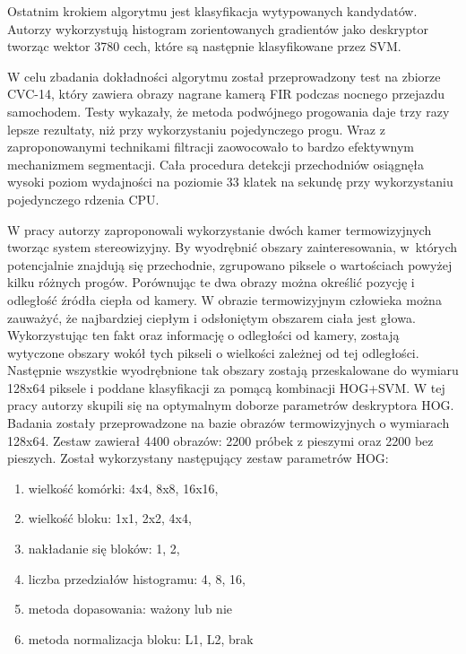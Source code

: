 Ostatnim krokiem algorytmu jest klasyfikacja wytypowanych kandydatów. 
Autorzy wykorzystują histogram zorientowanych gradientów jako deskryptor tworząc wektor 3780 cech, które są następnie klasyfikowane przez SVM.

W celu zbadania dokładności algorytmu został przeprowadzony test na zbiorze CVC-14, który zawiera obrazy nagrane kamerą FIR podczas nocnego przejazdu samochodem. 
Testy wykazały, że metoda podwójnego progowania daje trzy razy lepsze rezultaty, niż przy wykorzystaniu pojedynczego progu. 
Wraz z zaproponowanymi technikami filtracji zaowocowało to bardzo efektywnym mechanizmem segmentacji. %
Cała procedura detekcji przechodniów osiągnęła wysoki poziom wydajności na poziomie 33 klatek na sekundę przy wykorzystaniu pojedynczego rdzenia CPU.


W pracy \cite{suard2006pedestrian} autorzy zaproponowali wykorzystanie dwóch kamer termowizyjnych tworząc system stereowizyjny. 
By wyodrębnić obszary zainteresowania, w~których potencjalnie znajdują się przechodnie, zgrupowano piksele o wartościach powyżej kilku różnych progów.
Porównując te dwa obrazy można określić pozycję i odległość źródła ciepła od kamery. 
W obrazie termowizyjnym człowieka można zauważyć, że najbardziej ciepłym i odsłoniętym obszarem ciała jest głowa. %
Wykorzystując ten fakt oraz informację o odległości od kamery, zostają wytyczone obszary wokół tych pikseli o wielkości zależnej od tej odległości.
Następnie wszystkie wyodrębnione tak obszary zostają przeskalowane do wymiaru 128x64 piksele i poddane klasyfikacji za pomącą kombinacji HOG+SVM. 
W tej pracy autorzy skupili się na optymalnym doborze parametrów deskryptora HOG. 
Badania zostały przeprowadzone na bazie obrazów termowizyjnych o wymiarach 128x64. 
Zestaw zawierał 4400 obrazów: 2200 próbek z pieszymi oraz 2200 bez pieszych. 
Został wykorzystany następujący zestaw parametrów HOG:
\begin{enumerate}
\item wielkość komórki: 4x4, 8x8, 16x16,
\item wielkość bloku: 1x1, 2x2, 4x4,
\item nakładanie się bloków: 1, 2, %
\item liczba przedziałów histogramu: 4, 8, 16, %
\item metoda dopasowania: ważony lub nie %
\item metoda normalizacja bloku: L1, L2, brak %
\end{enumerate}

